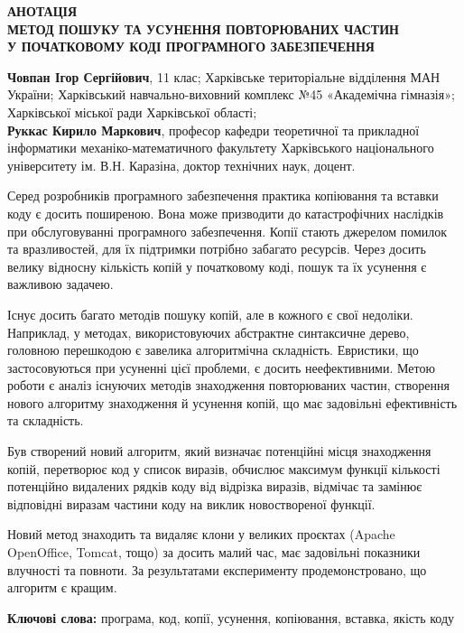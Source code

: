 \documentclass[a4paper, 14pt]{article}
\begin{document}
\pagebreak
\noindent
\begin{center}
\textbf{
АНОТАЦІЯ \\
МЕТОД ПОШУКУ ТА УСУНЕННЯ ПОВТОРЮВАНИХ ЧАСТИН \\ 
У ПОЧАТКОВОМУ КОДІ ПРОГРАМНОГО ЗАБЕЗПЕЧЕННЯ
}
\end{center}
\textbf{Човпан Ігор Сергійович}, 11 клас; Харківське територіальне відділення МАН України; Харківський навчально-виховний комплекс №45 «Академічна гімназія»; Харківської міської ради Харківської області; \\ \textbf{Руккас Кирило Маркович}, професор кафедри теоретичної та прикладної інформатики механіко-математичного факультету Харківського національного університету ім. В.Н. Каразіна, доктор технічних наук, доцент. \\
\par Серед розробників програмного забезпечення практика копіювання та вставки коду є досить поширеною. Вона може призводити до катастрофічних наслідків при обслуговуванні програмного забезпечення. Копії стають джерелом помилок та вразливостей, для їх підтримки потрібно забагато ресурсів.
Через досить велику відносну кількість копій у початковому коді, пошук та їх усунення є важливою задачею.
\par Існує досить багато методів пошуку копій, але в кожного є свої недоліки. Наприклад, у методах, використовуючих абстрактне синтаксичне дерево, головною перешкодою є завелика алгоритмічна складність. Евристики, що застосовуються при усуненні цієї проблеми, є досить неефективними.
Метою роботи є аналіз існуючих методів знаходження повторюваних частин, створення нового алгоритму знаходження й усунення копій, що має задовільні ефективність та складність.
\par Був створений новий алгоритм, який визначає потенційні місця знаходження копій, перетворює код у список виразів, обчислює максимум функції кількості потенційно видалених рядків коду від відрізка виразів, відмічає та замінює відповідні виразам частини коду на виклик новоствореної функції.
\par Новий метод знаходить та видаляє клони у великих проєктах (Apache OpenOffice, Tomcat, тощо) за досить малий час, має задовільні показники влучності та повноти.
За результатами експерименту продемонстровано, що алгоритм є кращим.
\par \textbf{Ключові слова:} програма, код, копії, усунення, копіювання, вставка, якість коду

\tableofcontents %
\end{document}
